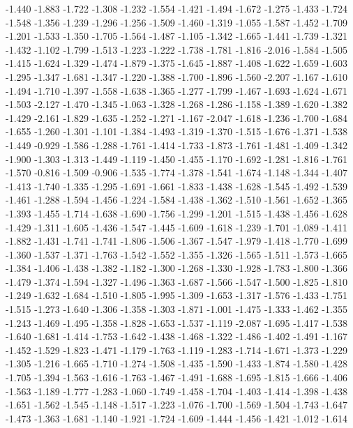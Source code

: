 \documentclass[9pt]{article}
\theoremstyle{plain}
\theoremstyle{definition}
\theoremstyle{remark}
\numberwithin{equation}{section}
\begin{document}
-1.440
-1.883
-1.722
-1.308
-1.232
-1.554
-1.421
-1.494
-1.672
-1.275
-1.433
-1.724
-1.548
-1.356
-1.239
-1.296
-1.256
-1.509
-1.460
-1.319
-1.055
-1.587
-1.452
-1.709
-1.201
-1.533
-1.350
-1.705
-1.564
-1.487
-1.105
-1.342
-1.665
-1.441
-1.739
-1.321
-1.432
-1.102
-1.799
-1.513
-1.223
-1.222
-1.738
-1.781
-1.816
-2.016
-1.584
-1.505
-1.415
-1.624
-1.329
-1.474
-1.879
-1.375
-1.645
-1.887
-1.408
-1.622
-1.659
-1.603
-1.295
-1.347
-1.681
-1.347
-1.220
-1.388
-1.700
-1.896
-1.560
-2.207
-1.167
-1.610
-1.494
-1.710
-1.397
-1.558
-1.638
-1.365
-1.277
-1.799
-1.467
-1.693
-1.624
-1.671
-1.503
-2.127
-1.470
-1.345
-1.063
-1.328
-1.268
-1.286
-1.158
-1.389
-1.620
-1.382
-1.429
-2.161
-1.829
-1.635
-1.252
-1.271
-1.167
-2.047
-1.618
-1.236
-1.700
-1.684
-1.655
-1.260
-1.301
-1.101
-1.384
-1.493
-1.319
-1.370
-1.515
-1.676
-1.371
-1.538
-1.449
-0.929
-1.586
-1.288
-1.761
-1.414
-1.733
-1.873
-1.761
-1.481
-1.409
-1.342
-1.900
-1.303
-1.313
-1.449
-1.119
-1.450
-1.455
-1.170
-1.692
-1.281
-1.816
-1.761
-1.570
-0.816
-1.509
-0.906
-1.535
-1.774
-1.378
-1.541
-1.674
-1.148
-1.344
-1.407
-1.413
-1.740
-1.335
-1.295
-1.691
-1.661
-1.833
-1.438
-1.628
-1.545
-1.492
-1.539
-1.461
-1.288
-1.594
-1.456
-1.224
-1.584
-1.438
-1.362
-1.510
-1.561
-1.652
-1.365
-1.393
-1.455
-1.714
-1.638
-1.690
-1.756
-1.299
-1.201
-1.515
-1.438
-1.456
-1.628
-1.429
-1.311
-1.605
-1.436
-1.547
-1.445
-1.609
-1.618
-1.239
-1.701
-1.089
-1.411
-1.882
-1.431
-1.741
-1.741
-1.806
-1.506
-1.367
-1.547
-1.979
-1.418
-1.770
-1.699
-1.360
-1.537
-1.371
-1.763
-1.542
-1.552
-1.355
-1.326
-1.565
-1.511
-1.573
-1.665
-1.384
-1.406
-1.438
-1.382
-1.182
-1.300
-1.268
-1.330
-1.928
-1.783
-1.800
-1.366
-1.479
-1.374
-1.594
-1.327
-1.496
-1.363
-1.687
-1.566
-1.547
-1.500
-1.825
-1.810
-1.249
-1.632
-1.684
-1.510
-1.805
-1.995
-1.309
-1.653
-1.317
-1.576
-1.433
-1.751
-1.515
-1.273
-1.640
-1.306
-1.358
-1.303
-1.871
-1.001
-1.475
-1.333
-1.462
-1.355
-1.243
-1.469
-1.495
-1.358
-1.828
-1.653
-1.537
-1.119
-2.087
-1.695
-1.417
-1.538
-1.640
-1.681
-1.414
-1.753
-1.642
-1.438
-1.468
-1.322
-1.486
-1.402
-1.491
-1.167
-1.452
-1.529
-1.823
-1.471
-1.179
-1.763
-1.119
-1.283
-1.714
-1.671
-1.373
-1.229
-1.305
-1.216
-1.665
-1.710
-1.274
-1.508
-1.435
-1.590
-1.433
-1.874
-1.580
-1.428
-1.705
-1.394
-1.563
-1.616
-1.763
-1.467
-1.491
-1.688
-1.695
-1.815
-1.666
-1.406
-1.563
-1.189
-1.777
-1.283
-1.060
-1.749
-1.458
-1.704
-1.403
-1.414
-1.398
-1.438
-1.651
-1.562
-1.545
-1.148
-1.517
-1.223
-1.076
-1.700
-1.569
-1.504
-1.743
-1.647
-1.473
-1.363
-1.681
-1.140
-1.921
-1.724
-1.609
-1.444
-1.456
-1.421
-1.012
-1.614
\end{document}
